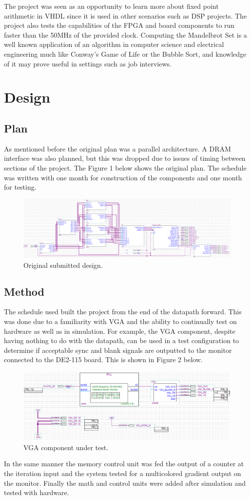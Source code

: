\documentclass[titlepage]{article}      %
\begin{document}
The project was seen as an opportunity to learn more about fixed point arithmetic in VHDL since it is used in other scenarios such as DSP projects. The project also tests the capabilities of the FPGA and board components to run faster than the 50MHz of the provided clock. Computing the Mandelbrot Set is a well known application of an algorithm in computer science and electrical engineering much like Conway's Game of Life or the Bubble Sort, and knowledge of it may prove useful in settings such as job interviews.
\section{Design}
\subsection{Plan}
As mentioned before the original plan was a parallel architecture. A DRAM interface was also planned, but this was dropped due to issues of timing between sections of the project. The Figure 1 below shows the original plan. The schedule was written with one month for construction of the components and one month for testing.
\begin{figure}[H]
\centering
\includegraphics[width=6in]{Diagram}
\caption{Original submitted design.}
\end{figure}
\subsection{Method}
The schedule used built the project from the end of the datapath forward. This was done due to a familiarity with VGA and the ability to continually test on hardware as well as in simulation. For example, the VGA component, despite having nothing to do with the datapath, can be used in a test configuration to determine if acceptable sync and blank signals are outputted to the monitor connected to the DE2-115 board. This is shown in Figure 2 below.
\begin{figure}[H]
\centering
\includegraphics[width=6in]{VGAtest}
\caption{VGA component under test.}
\end{figure}
In the same manner the memory control unit was fed the output of a counter at the iteration input and the system tested for a multicolored gradient output on the monitor. Finally the math and control units were added after simulation and tested with hardware.
\end{document}
